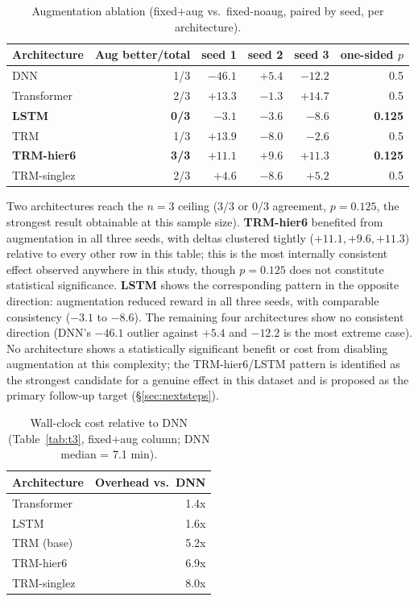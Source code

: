 \documentclass[11pt]{article}
\begin{document}
\begin{table}[h]
\centering
\small
\begin{tabular}{lrrrrr}
\toprule
Architecture & Aug better/total & seed 1 & seed 2 & seed 3 & one-sided $p$ \\
\midrule
DNN & 1/3 & $-46.1$ & $+5.4$ & $-12.2$ & 0.5 \\
Transformer & 2/3 & $+13.3$ & $-1.3$ & $+14.7$ & 0.5 \\
\textbf{LSTM} & \textbf{0/3} & \textbf{$-3.1$} & \textbf{$-3.6$} & \textbf{$-8.6$} & \textbf{0.125} \\
TRM & 1/3 & $+13.9$ & $-8.0$ & $-2.6$ & 0.5 \\
\textbf{TRM-hier6} & \textbf{3/3} & \textbf{$+11.1$} & \textbf{$+9.6$} & \textbf{$+11.3$} & \textbf{0.125} \\
TRM-singlez & 2/3 & $+4.6$ & $-8.6$ & $+5.2$ & 0.5 \\
\bottomrule
\end{tabular}
\caption{Augmentation ablation (fixed+aug vs.\ fixed-noaug, paired by seed, per architecture).}
\label{tab:t6}
\end{table}

Two architectures reach the $n=3$ ceiling (3/3 or 0/3 agreement, $p=0.125$, the strongest result obtainable at this sample size). \textbf{TRM-hier6} benefited from augmentation in all three seeds, with deltas clustered tightly ($+11.1, +9.6, +11.3$) relative to every other row in this table; this is the most internally consistent effect observed anywhere in this study, though $p=0.125$ does not constitute statistical significance. \textbf{LSTM} shows the corresponding pattern in the opposite direction: augmentation reduced reward in all three seeds, with comparable consistency ($-3.1$ to $-8.6$). The remaining four architectures show no consistent direction (DNN's $-46.1$ outlier against $+5.4$ and $-12.2$ is the most extreme case). No architecture shows a statistically significant benefit or cost from disabling augmentation at this complexity; the TRM-hier6/LSTM pattern is identified as the strongest candidate for a genuine effect in this dataset and is proposed as the primary follow-up target (\S\ref{sec:nextsteps}).

\begin{table}[h]
\centering
\small
\begin{tabular}{lr}
\toprule
Architecture & Overhead vs.\ DNN \\
\midrule
Transformer & 1.4x \\
LSTM & 1.6x \\
TRM (base) & 5.2x \\
TRM-hier6 & 6.9x \\
TRM-singlez & 8.0x \\
\bottomrule
\end{tabular}
\caption{Wall-clock cost relative to DNN (Table~\ref{tab:t3}, fixed+aug column; DNN median = 7.1 min).}
\label{tab:t7}
\end{table}
\end{document}
